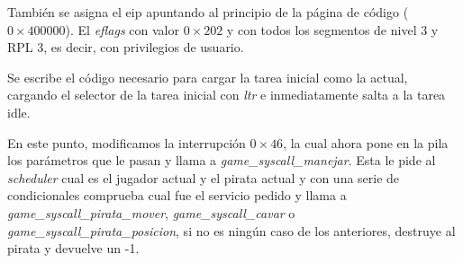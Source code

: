 También se asigna el eip apuntando al principio de la página de código
($0\times400000$). El {\it eflags\/} con valor $0\times202$ y con todos los
segmentos de nivel 3 y RPL 3, es decir, con privilegios de usuario.

Se escribe el código necesario para cargar la tarea inicial como la actual,
cargando el selector de la tarea inicial con {\it ltr\/} e inmediatamente salta
a la tarea idle.

En este punto, modificamos la interrupción $0\times46$, la cual ahora pone en la
pila los parámetros que le pasan y llama a {\it game_syscall_manejar\/}. Esta le
pide al {\it scheduler\/} cual es el jugador actual y el pirata actual y con una
serie de condicionales comprueba cual fue el servicio pedido y llama a
{\it game_syscall_pirata_mover\/}, {\it game_syscall_cavar\/} o
{\it game_syscall_pirata_posicion\/}, si no es ningún caso de los anteriores,
destruye al pirata y devuelve un -1.

